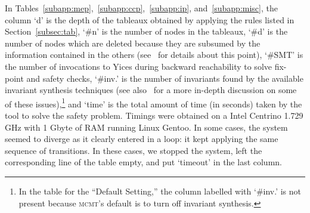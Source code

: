 \documentclass{LMCS}
\theoremstyle{plain}\newtheorem{assumption}[thm]{Assumption}
\theoremstyle{plain}\newtheorem{proposition}[thm]{Proposition}
\theoremstyle{plain}\newtheorem{property}[thm]{Property}
\theoremstyle{plain}\newtheorem{example}[thm]{Example}
\theoremstyle{plain}\newtheorem{claim}[thm]{Claim}
\theoremstyle{plain}\newtheorem{lemma}[thm]{Lemma}
\begin{document}
In Tables~\ref{subapp:mep},~\ref{subapp:ccp},~\ref{subapp:ip},
and~\ref{subapp:misc}, the column `d' is the depth of the tableaux
obtained by applying the rules listed in Section~\ref{subsec:tab},
`\#n' is the number of nodes in the tableaux, `\#d' is the number of
nodes which are deleted because they are subsumed by the information
contained in the others (see~\cite{afm09} for details about this
point), `\#SMT' is the number of invocations to Yices during backward
reachability to solve fix-point and safety checks, `\#inv.'  is the
number of invariants found by the available invariant synthesis
techniques (see also~\cite{tableaux09} for a more in-depth discussion
on some of these issues),\footnote{In the table for the ``Default
  Setting,'' the column labelled with `\#inv.' is not present because
  \textsc{mcmt}'s default is to turn off invariant synthesis.} and
`time' is the total amount of time (in seconds) taken by the tool to
solve the safety problem.  Timings were obtained on a Intel Centrino
1.729 GHz with 1 Gbyte of RAM running Linux Gentoo.  In some cases,
the system seemed to diverge as it clearly entered in a loop: it kept
applying the same sequence of transitions.  In these cases, we stopped
the system, left the corresponding line of the table empty, and put
`timeout' in the last column.
\end{document}
